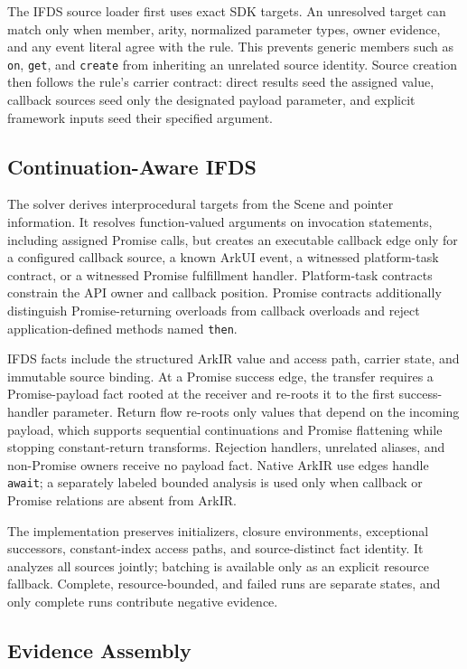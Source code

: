 The IFDS source loader first uses exact SDK targets. An unresolved target can match only when member, arity, normalized parameter types, owner evidence, and any event literal agree with the rule. This prevents generic members such as \texttt{on}, \texttt{get}, and \texttt{create} from inheriting an unrelated source identity. Source creation then follows the rule's carrier contract: direct results seed the assigned value, callback sources seed only the designated payload parameter, and explicit framework inputs seed their specified argument.

\subsection{Continuation-Aware IFDS}

The solver derives interprocedural targets from the Scene and pointer information. It resolves function-valued arguments on invocation statements, including assigned Promise calls, but creates an executable callback edge only for a configured callback source, a known ArkUI event, a witnessed platform-task contract, or a witnessed Promise fulfillment handler. Platform-task contracts constrain the API owner and callback position. Promise contracts additionally distinguish Promise-returning overloads from callback overloads and reject application-defined methods named \texttt{then}.

IFDS facts include the structured ArkIR value and access path, carrier state, and immutable source binding. At a Promise success edge, the transfer requires a Promise-payload fact rooted at the receiver and re-roots it to the first success-handler parameter. Return flow re-roots only values that depend on the incoming payload, which supports sequential continuations and Promise flattening while stopping constant-return transforms. Rejection handlers, unrelated aliases, and non-Promise owners receive no payload fact. Native ArkIR use edges handle \texttt{await}; a separately labeled bounded analysis is used only when callback or Promise relations are absent from ArkIR.

The implementation preserves initializers, closure environments, exceptional successors, constant-index access paths, and source-distinct fact identity. It analyzes all sources jointly; batching is available only as an explicit resource fallback. Complete, resource-bounded, and failed runs are separate states, and only complete runs contribute negative evidence.

\subsection{Evidence Assembly}

